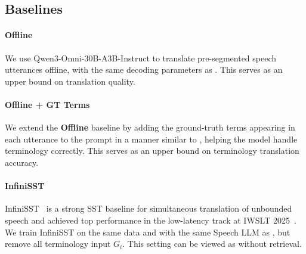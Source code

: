 \subsection{Baselines}

\paragraph{Offline}
We use Qwen3-Omni-30B-A3B-Instruct to translate pre-segmented speech utterances offline, with the same decoding parameters as \method. This serves as an upper bound on translation quality.

\paragraph{Offline + GT Terms}
We extend the \textbf{Offline} baseline by adding the ground-truth terms appearing in each utterance to the prompt in a manner similar to \citet{gong24b_interspeech}, helping the model handle terminology correctly. This serves as an upper bound on terminology translation accuracy.

\paragraph{InfiniSST}
InfiniSST~\citep{ouyang-etal-2025-infinisst} is a strong SST baseline for simultaneous translation of unbounded speech and achieved top performance in the low-latency track at IWSLT 2025~\citep{ouyang-etal-2025-cmus,agostinelli-etal-2025-findings}. We train InfiniSST on the same data and with the same Speech LLM as \method, but remove all terminology input $G_i$. This setting can be viewed as \method without retrieval.
